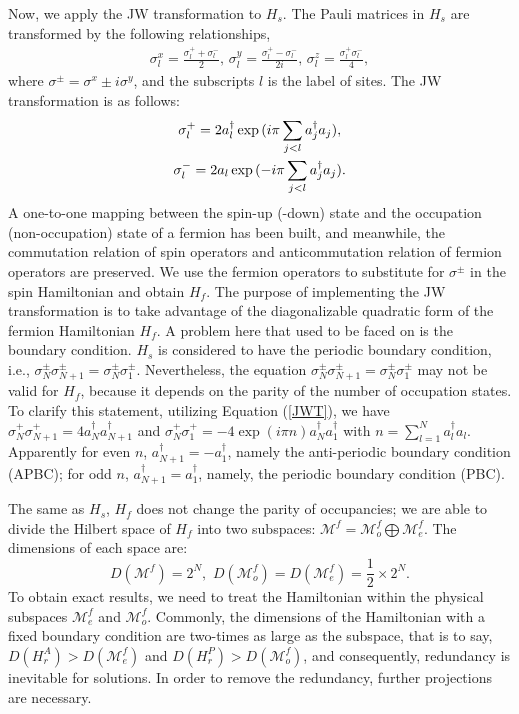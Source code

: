 \documentclass[twocolumn,floats,superscriptaddress]{revtex4}
\begin{document}
Now, we apply the JW transformation to $H_s$. The Pauli matrices in $H_s$ are transformed by {the following relationships},
\begin{gather}\label{pauli}
\sigma_l^x=\frac{\sigma_l^+ +\sigma_l^-}{2},\,
\sigma_l^y=\frac{\sigma_l^+ -\sigma_l^-}{2i},\,
\sigma_l^z=\frac{\sigma_l^+ \sigma_l^-}{4},
\end{gather}
where $\sigma^{\pm}=\sigma^x\pm i \sigma^y$, and the subscripts $l$ is the {label} of sites.
The JW transformation is as follows:
\begin{gather}
\sigma_l^+=2a_l^\dag \exp{(i\pi\sum_{j<l}{a^\dag_{j}a_j})},\notag
\\
\sigma_l^-=2a_l \exp{(-i\pi\sum_{j<l}{a^\dag_{j}a_j})}.\label{JWT}
\end{gather}
A one-to-one mapping between the spin-up (-down) state and the occupation (non-occupation) state of a fermion has been built, and meanwhile, the commutation relation of spin operators and anticommutation relation of fermion operators are preserved. We use the fermion operators to substitute for $\sigma^\pm$ in the spin Hamiltonian and obtain $H_f$. The purpose of implementing the JW transformation is to take advantage of {the diagonalizable} quadratic form of {the} fermion Hamiltonian $H_f$. A problem here that used to {be faced on} is the boundary condition. $H_s$ is considered to have the periodic boundary condition, i.e., $\sigma_{N}^{\pm}\sigma_{N+1}^{\pm}=\sigma_{N}^{\pm}\sigma_{1}^{\pm}$. {Nevertheless}, the equation $\sigma_{N}^{\pm}\sigma_{N+1}^{\pm}=\sigma_{N}^{\pm}\sigma_{1}^{\pm}$ may not be valid for $H_f$, {because it depends on} the parity of the number of occupation states. {To clarify this statement}, utilizing Equation (\ref{JWT}), we have
$\sigma_{N}^{+}\sigma_{N+1}^{+}=4a_N^{\dag}a_{N+1}^{\dag}$ and $\sigma_{N}^{+}\sigma_{1}^{+}=-4\exp{(i\pi n)}a_N^{\dag}a_{1}^{\dag}$ with $n=\sum_{l=1}^{N}{a^\dag_{l}a_l}$. Apparently for even $n$, $a_{N+1}^{\dag}=-a_{1}^{\dag}$, namely the anti-periodic boundary condition (APBC); for odd $n$, $a_{N+1}^{\dag}=a_{1}^{\dag}$, namely, the periodic boundary condition (PBC).

The same as $H_s$, $H_f$ does not change the parity of occupancies; we are able to divide the Hilbert space of $H_f$ into two subspaces: $\mathcal{M}^f=\mathcal{M}_{ o}^f\bigoplus\mathcal{M}_{e}^f$. The dimensions of each space are:
\begin{equation}\label{dspace}
D(\mathcal{M}^f)=2^N,\,\, D(\mathcal{M}_{o}^f)=D(\mathcal{M}_{e}^f)=\frac{1}{2}\times2^N.
\end{equation}
To obtain exact results, {we need to treat the Hamiltonian within the physical subspaces $\mathcal{M}_{e}^f$ and $\mathcal{M}_{o}^f$.} Commonly, the dimensions of the Hamiltonian with a fixed boundary condition are two-times as large as the subspace, that is to say, $D(H_r^A)>D(\mathcal{M}_{e}^f)$ and $D(H_r^P)>D(\mathcal{M}_{o}^f)$, and consequently, redundancy is inevitable {for solutions}. In order to remove the redundancy, further projections are necessary.
\end{document}
